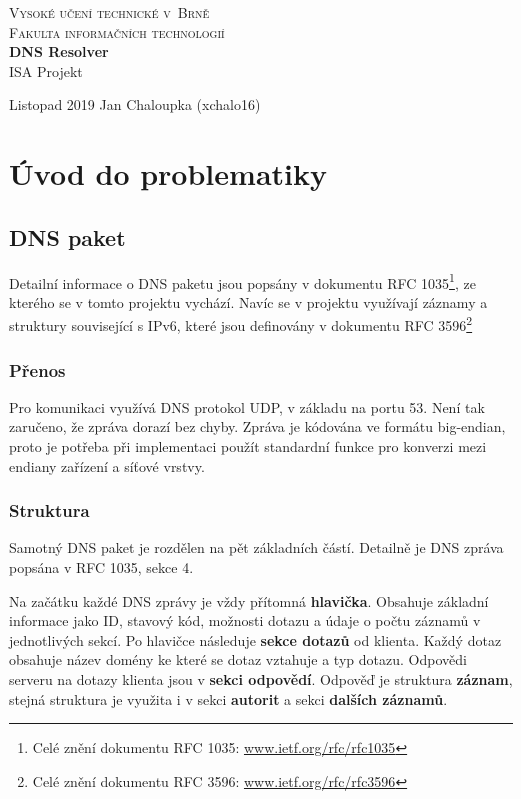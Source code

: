 \documentclass[a4paper,12pt]{article}
\begin{document}
\begin{titlepage}
	\begin{center}
		{
			\LARGE\textsc{Vysoké učení technické v~Brně}\\
			\Large\textsc{Fakulta informačních technologií}\\
		}
		{
			\textbf{\Huge DNS Resolver}\\
			\vspace{3mm}
			\LARGE ISA Projekt\\
		}
	\end{center}
	{\large Listopad 2019 \hfill Jan Chaloupka (xchalo16)}
\end{titlepage}
\tableofcontents
\newpage

\section{Úvod do problematiky}
\subsection{DNS paket}
Detailní informace o DNS paketu jsou popsány v dokumentu RFC 1035\footnote{Celé znění dokumentu RFC 1035: \url{www.ietf.org/rfc/rfc1035}}, ze kterého se v tomto projektu vychází. Navíc se v projektu využívají záznamy a struktury související s IPv6, které jsou definovány v dokumentu RFC 3596\footnote{Celé znění dokumentu RFC 3596: \url{www.ietf.org/rfc/rfc3596}}

\subsubsection{Přenos}
Pro komunikaci využívá DNS protokol UDP, v základu na portu 53. Není tak zaručeno, že zpráva dorazí bez chyby. Zpráva je kódována ve formátu big-endian, proto je potřeba při implementaci použít standardní funkce pro konverzi mezi endiany zařízení a síťové vrstvy.

\subsubsection{Struktura}
Samotný DNS paket je rozdělen na pět základních částí. Detailně je DNS zpráva popsána v RFC 1035, sekce 4.

Na začátku každé DNS zprávy je vždy přítomná \textbf{hlavička}. Obsahuje základní informace jako ID, stavový kód, možnosti dotazu a údaje o počtu záznamů v jednotlivých sekcí.
Po hlavičce následuje \textbf{sekce dotazů} od klienta. Každý dotaz obsahuje název domény ke které se dotaz vztahuje a typ dotazu.
Odpovědi serveru na dotazy klienta jsou v \textbf{sekci odpovědí}. Odpověď je struktura \textbf{záznam}, stejná struktura je využita i v sekci \textbf{autorit} a sekci \textbf{dalších záznamů}.
\end{document}

